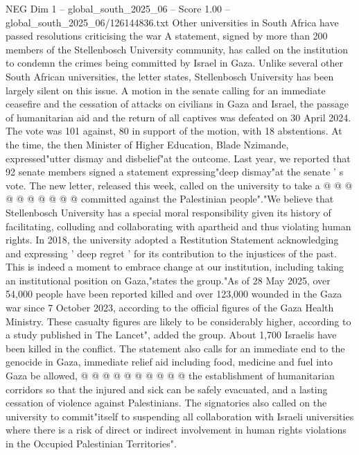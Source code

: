 \begin{textsample}{NEG Dim 1 – global\_south\_2025\_06 – Score 1.00 – global\_south\_2025\_06/126144836.txt}  \label{ex:f1_neg_244}
Other universities in South Africa have passed resolutions criticising the war A statement, signed by more than 200 members of the Stellenbosch University community, has called on the institution to condemn the crimes being committed by Israel in Gaza.
Unlike several other South African universities, the letter states, Stellenbosch University has been largely silent on this issue.
A motion in the senate calling for an immediate ceasefire and the cessation of attacks on civilians in Gaza and Israel, the passage of humanitarian aid and the return of all captives was defeated on 30 April 2024.
The vote was 101 against, 80 in support of the motion, with 18 abstentions.
At the time, the then Minister of Higher Education, Blade Nzimande, expressed"utter dismay and disbelief"at the outcome.
Last year, we reported that 92 senate members signed a statement expressing"deep dismay"at the senate ' s vote.
The new letter, released this week, called on the university to take a @ @ @ @ @ @ @ @ @ @ committed against the Palestinian people"."We believe that Stellenbosch University has a special moral responsibility given its history of facilitating, colluding and collaborating with apartheid and thus violating human rights.
In 2018, the university adopted a Restitution Statement acknowledging and expressing ' deep regret ' for its contribution to the injustices of the past.
This is indeed a moment to embrace change at our institution, including taking an institutional position on Gaza,"states the group."As of 28 May 2025, over 54,000 people have been reported killed and over 123,000 wounded in the Gaza war since 7 October 2023, according to the official figures of the Gaza Health Ministry.
These casualty figures are likely to be considerably higher, according to a study published in The Lancet", added the group.
About 1,700 Israelis have been killed in the conflict.
The statement also calls for an immediate end to the genocide in Gaza, immediate relief aid including food, medicine and fuel into Gaza be allowed, @ @ @ @ @ @ @ @ @ @ the establishment of humanitarian corridors so that the injured and sick can be safely evacuated, and a lasting cessation of violence against Palestinians.
The signatories also called on the university to commit"itself to suspending all collaboration with Israeli universities where there is a risk of direct or indirect involvement in human rights violations in the Occupied Palestinian Territories".

\end{textsample}
